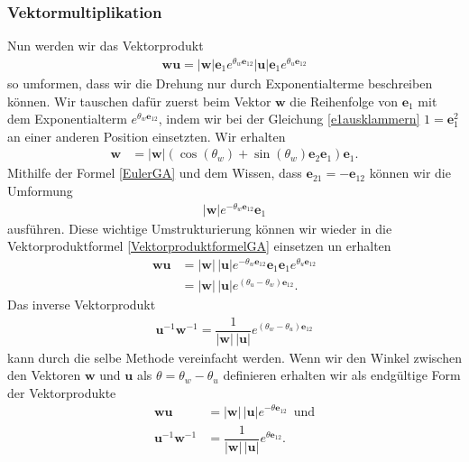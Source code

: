 \subsubsection{Vektormultiplikation}
Nun werden wir das Vektorprodukt
\begin{align} \label{VektorproduktformelGA}
\mathbf{wu} = |\mathbf{w}|\mathbf{e}_1 e^{\theta_w \mathbf{e}_{12}}|\mathbf{u}|\mathbf{e}_1 e^{\theta_u \mathbf{e}_{12}}
\end{align}
so umformen, dass wir die Drehung nur durch Exponentialterme beschreiben können. Wir tauschen dafür zuerst beim Vektor $\mathbf{w}$ die Reihenfolge von 
$\mathbf{e}_1$ mit dem Exponentialterm $e^{\theta_w \mathbf{e}_{12}}$, indem wir bei der Gleichung \eqref{e1ausklammern} $1=\mathbf{e}_1^2$ an einer anderen Position einsetzten. Wir erhalten
\begin{align} 
\mathbf{w} &= |\mathbf{w}|\left(\cos(\theta_w)+ \sin(\theta_w) \mathbf{e}_2\mathbf{e}_1\right)\mathbf{e}_1.
\end{align}
Mithilfe der Formel \eqref{EulerGA} und dem Wissen, dass $\mathbf{e}_{21}= -\mathbf{e}_{12}$ können wir die Umformung
\begin{align}
|\mathbf{w}|e^{-\theta_w \mathbf{e}_{12}}\mathbf{e}_1
\end{align}
ausführen. Diese wichtige Umstrukturierung können wir wieder in die Vektorproduktformel \eqref{VektorproduktformelGA} einsetzen un erhalten
\begin{align}
\mathbf{wu} &= |\mathbf{w}|\,|\mathbf{u}|e^{-\theta_w \mathbf{e}_{12}}\mathbf{e}_1\mathbf{e}_1 e^{\theta_u \mathbf{e}_{12}}\\
&= |\mathbf{w}|\,|\mathbf{u}|e^{(\theta_u-\theta_w) \mathbf{e}_{12}}.
\end{align}
Das inverse Vektorprodukt
\begin{align}
\mathbf{u}^{-1}\mathbf{w}^{-1} = \dfrac{1}{|\mathbf{w}|\,|\mathbf{u}|}e^{(\theta_w-\theta_u) \mathbf{e}_{12}}
\end{align}
kann durch die selbe Methode vereinfacht werden.
Wenn wir den Winkel zwischen den Vektoren  $\mathbf{w}$ und $\mathbf{u}$ als $\theta = \theta_w - \theta_u$ definieren erhalten wir als endgültige Form der Vektorprodukte
\begin{align}\label{wuExpo}
\mathbf{wu} &= |\mathbf{w}|\,|\mathbf{u}|e^{-\theta \mathbf{e}_{12}}\enspace\text{und}\\
\mathbf{u}^{-1}\mathbf{w}^{-1} &= \dfrac{1}{|\mathbf{w}|\,|\mathbf{u}|}e^{\theta \mathbf{e}_{12}} \label{wuExpoInv}.
\end{align}

